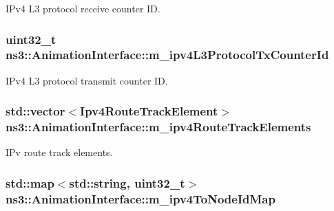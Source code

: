 I\+Pv4 L3 protocol receive counter ID. 

\subsubsection[{\texorpdfstring{m\+\_\+ipv4\+L3\+Protocol\+Tx\+Counter\+Id}{m_ipv4L3ProtocolTxCounterId}}]{\setlength{\rightskip}{0pt plus 5cm}uint32\+\_\+t ns3\+::\+Animation\+Interface\+::m\+\_\+ipv4\+L3\+Protocol\+Tx\+Counter\+Id\hspace{0.3cm}{\ttfamily [private]}}\hypertarget{classns3_1_1AnimationInterface_a7d8f8efdeb1c2e56ea32badbb48ca68c}{}\label{classns3_1_1AnimationInterface_a7d8f8efdeb1c2e56ea32badbb48ca68c}


I\+Pv4 L3 protocol transmit counter ID. 

\subsubsection[{\texorpdfstring{m\+\_\+ipv4\+Route\+Track\+Elements}{m_ipv4RouteTrackElements}}]{\setlength{\rightskip}{0pt plus 5cm}std\+::vector$<${\bf Ipv4\+Route\+Track\+Element}$>$ ns3\+::\+Animation\+Interface\+::m\+\_\+ipv4\+Route\+Track\+Elements\hspace{0.3cm}{\ttfamily [private]}}\hypertarget{classns3_1_1AnimationInterface_ae34a5934529aba007040aca4fe7ca0fb}{}\label{classns3_1_1AnimationInterface_ae34a5934529aba007040aca4fe7ca0fb}


I\+Pv route track elements. 

\subsubsection[{\texorpdfstring{m\+\_\+ipv4\+To\+Node\+Id\+Map}{m_ipv4ToNodeIdMap}}]{\setlength{\rightskip}{0pt plus 5cm}std\+::map$<$std\+::string, uint32\+\_\+t$>$ ns3\+::\+Animation\+Interface\+::m\+\_\+ipv4\+To\+Node\+Id\+Map\hspace{0.3cm}{\ttfamily [private]}}\hypertarget{classns3_1_1AnimationInterface_ae8061a2f8540660d0fa851e98d8c7565}{}\label{classns3_1_1AnimationInterface_ae8061a2f8540660d0fa851e98d8c7565}


